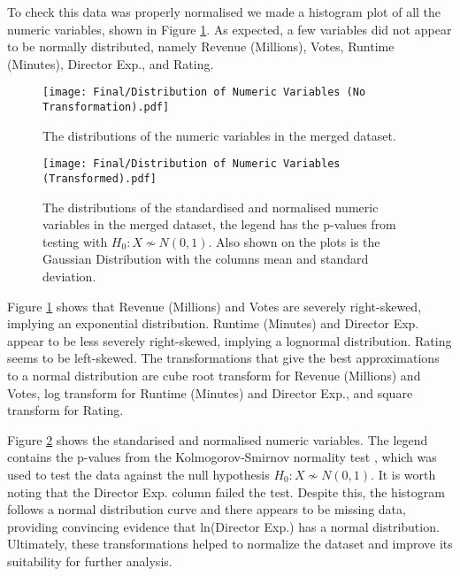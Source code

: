     \begin{multicols}{2}
        To check this data was properly normalised we made a histogram plot of all the
            numeric variables, shown in Figure \ref{fig-distribution-of-numeric-variable}.
        As expected, a few variables did not appear to be normally distributed, namely
            Revenue (Millions), Votes, Runtime (Minutes), Director Exp., and Rating.
        \begin{figure}[H]
            \centering
            \texttt{[image: Final/Distribution of Numeric Variables (No Transformation).pdf]}
            \caption{The distributions of the numeric variables in the merged dataset.}\label{fig-distribution-of-numeric-variable}
        \end{figure}
        \begin{figure}[H]
            \centering
            \texttt{[image: Final/Distribution of Numeric Variables (Transformed).pdf]}
            \caption{The distributions of the standardised and normalised numeric variables
                in the merged dataset, the legend has the p-values from testing with
                $H_{0}: X \not\sim N(0,1)$.
                Also shown on the plots is the Gaussian Distribution with the columns mean and
                    standard deviation.
            }\label{fig-transformed-distribution-of-numeric-variable}
        \end{figure}
        Figure \ref{fig-distribution-of-numeric-variable} shows that Revenue (Millions)
            and Votes are severely right-skewed, implying an exponential distribution.
        Runtime (Minutes) and Director Exp.
        appear to be less severely right-skewed,
        implying a lognormal distribution.
        Rating seems to be left-skewed.
        The transformations that give the best approximations to a normal distribution
            are cube root transform for Revenue (Millions) and Votes, log transform for
            Runtime (Minutes) and Director Exp., and square transform for Rating.

        Figure \ref{fig-transformed-distribution-of-numeric-variable} shows the
            standarised and normalised numeric variables.
        The legend contains the p-values from the Kolmogorov-Smirnov normality test
            \cite{KStest}, which was used to test the data against the null hypothesis
            $H_{0}: X \not\sim N(0,1)$.
        It is worth noting that the Director Exp.
        column failed the test.
        Despite this, the histogram follows a normal distribution curve and there
            appears to be missing data, providing convincing evidence that ln(Director
            Exp.)
        has a normal distribution.
        Ultimately, these transformations helped to normalize the dataset and improve
            its suitability for further analysis.


\end{multicols}
